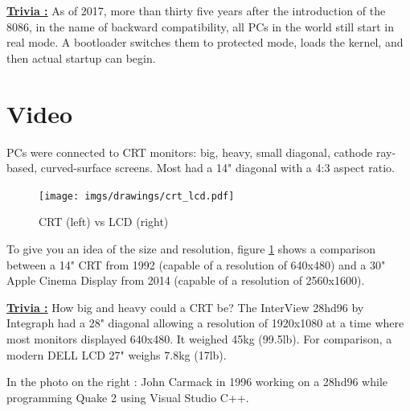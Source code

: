 \documentclass[book.tex]{subfiles}
\begin{document}
\textbf{\underline{Trivia :}}  As of 2017, more than thirty five years after the introduction of the 8086, in the name of backward compatibility, all PCs in the world still start in real mode. A bootloader switches them to protected mode, loads the kernel, and then actual startup can begin.














\section{Video}

PCs were connected to CRT monitors: big, heavy, small diagonal, cathode ray-based, curved-surface screens. Most had a 14" diagonal with a 4:3 aspect ratio.\\
\par


\begin{figure}[H]
\centering
\texttt{[image: imgs/drawings/crt\_lcd.pdf]}
\caption{CRT (left) vs LCD (right)}
\label{fig:lcd_vs_crt}
\end{figure}
\par
  To give you an idea of the size and resolution, figure \ref{fig:lcd_vs_crt} shows a comparison between a 14" CRT from 1992 (capable of a resolution of 640x480) and a 30" Apple Cinema Display from 2014 (capable of a resolution of 2560x1600).\\
  \par
{}



\begin{minipage}{.4\textwidth}
\textbf{\underline{Trivia :}} How big and heavy could a CRT be? The InterView 28hd96 by Integraph had a 28" diagonal allowing a resolution of 1920x1080 at a time where most monitors displayed 640x480. It weighed 45kg (99.5lb). For comparison, a modern DELL LCD 27" weighs 7.8kg (17lb).\\
\par
In the photo on the right : John Carmack in 1996 working on a 28hd96 while programming Quake 2 using Visual Studio C++.\\
\end{minipage}
\begin{minipage}{.6\textwidth}
\begin{figure}[H]
  \begin{flushright}
       \vspace{-10pt}
    \end{flushright}
\end{figure}
\end{minipage}
\end{document}
